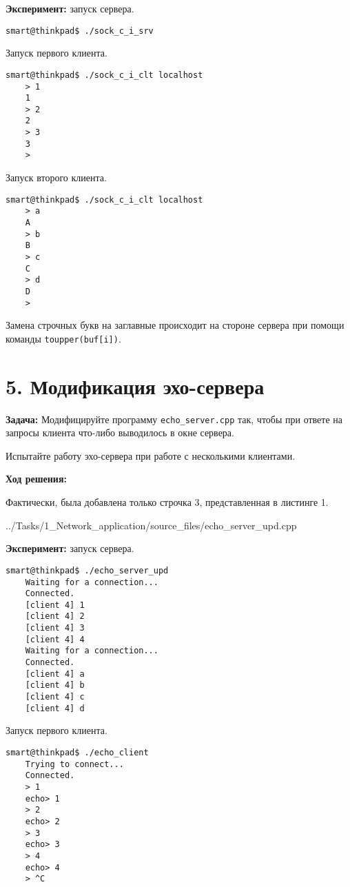 \textbf{Эксперимент:} запуск сервера.
\begin{Verbatim}[frame=single]
    smart@thinkpad$ ./sock_c_i_srv 
\end{Verbatim}

Запуск первого клиента.
\begin{Verbatim}[frame=single]
    smart@thinkpad$ ./sock_c_i_clt localhost
    > 1
    1
    > 2
    2
    > 3
    3
    > 
\end{Verbatim}

Запуск второго клиента.
\begin{Verbatim}[frame=single]
    smart@thinkpad$ ./sock_c_i_clt localhost
    > a
    A
    > b
    B
    > c
    C
    > d
    D
    > 
\end{Verbatim}

Замена строчных букв на заглавные происходит на стороне сервера при помощи команды \texttt{toupper(buf[i])}.

\section*{5. Модификация эхо-сервера}
\textbf{Задача:} Модифицируйте программу \texttt{echo\_server.cpp} так, чтобы при ответе на запросы клиента что-либо выводилось в окне сервера.

Испытайте работу эхо-сервера при работе с несколькими клиентами.

\textbf{Ход решения:}

Фактически, была добавлена только строчка 3, представленная в листинге 1.


{../Tasks/1_Network_application/source_files/echo_server_upd.cpp}

\textbf{Эксперимент:} запуск сервера.
\begin{Verbatim}[frame=single]
    smart@thinkpad$ ./echo_server_upd 
    Waiting for a connection...
    Connected.
    [client 4] 1
    [client 4] 2
    [client 4] 3
    [client 4] 4
    Waiting for a connection...
    Connected.
    [client 4] a
    [client 4] b
    [client 4] c
    [client 4] d
\end{Verbatim}

Запуск первого клиента.
\begin{Verbatim}[frame=single]
    smart@thinkpad$ ./echo_client 
    Trying to connect...
    Connected.
    > 1
    echo> 1
    > 2
    echo> 2
    > 3
    echo> 3
    > 4
    echo> 4
    > ^C
\end{Verbatim}


